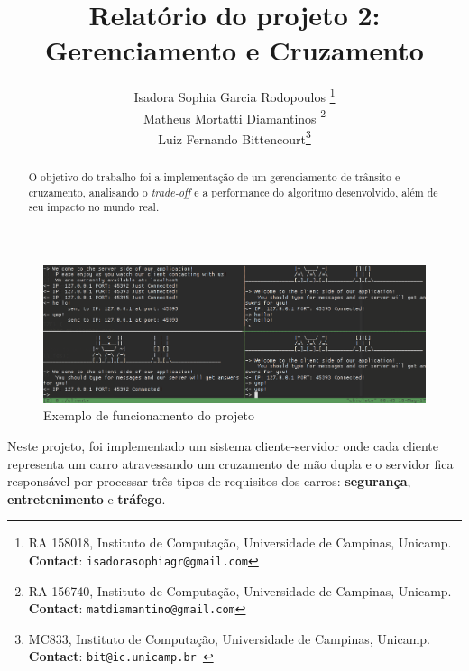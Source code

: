\documentclass[10pt,twocolumn,letterpaper]{article}
\begin{document}
\title{Relatório do projeto 2: Gerenciamento e Cruzamento}
\author{Isadora Sophia Garcia Rodopoulos \thanks{RA 158018, Instituto de Computação, Universidade de Campinas, Unicamp. \textbf{Contact}: \tt\small{isadorasophiagr@gmail.com}} \\
Matheus Mortatti Diamantinos \thanks{RA 156740, Instituto de Computação, Universidade de Campinas, Unicamp. \textbf{Contact}: \tt\small{matdiamantino@gmail.com}}\\
Luiz Fernando Bittencourt\thanks{MC833, Instituto de Computação, Universidade de Campinas, Unicamp. \textbf{Contact}: \tt\small{bit@ic.unicamp.br }}\\
}

\maketitle
\begin{abstract}
O objetivo do trabalho foi a implementação de um gerenciamento de trânsito e cruzamento, analisando o \textit{trade-off} e a performance do algoritmo desenvolvido, além de seu impacto no mundo real.
\end{abstract}

\begin{figure}
\begin{center}
    \includegraphics[width=1\textwidth]{img/sample.png}
    \caption{Exemplo de funcionamento do projeto}   
\end{center} 
\end{figure}

Neste projeto, foi implementado um sistema cliente-servidor onde cada cliente representa um carro atravessando um cruzamento de mão dupla e o servidor fica responsável por processar três tipos de requisitos dos carros: \textbf{segurança}, \textbf{entretenimento} e \textbf{tráfego}.
\end{document}
